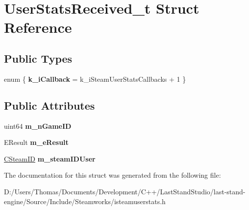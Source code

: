 \hypertarget{structUserStatsReceived__t}{}\section{User\+Stats\+Received\+\_\+t Struct Reference}
\label{structUserStatsReceived__t}
\subsection*{Public Types}
\begin{DoxyCompactItemize}
\item 
\hypertarget{structUserStatsReceived__t_ac24670a3f380c280ee4356b5b9950954}{}enum \{ {\bfseries k\+\_\+i\+Callback} = k\+\_\+i\+Steam\+User\+Stats\+Callbacks + 1
 \}\label{structUserStatsReceived__t_ac24670a3f380c280ee4356b5b9950954}

\end{DoxyCompactItemize}
\subsection*{Public Attributes}
\begin{DoxyCompactItemize}
\item 
\hypertarget{structUserStatsReceived__t_abee16d071fcdbdf406571d3cedea93ad}{}uint64 {\bfseries m\+\_\+n\+Game\+I\+D}\label{structUserStatsReceived__t_abee16d071fcdbdf406571d3cedea93ad}

\item 
\hypertarget{structUserStatsReceived__t_a6e261e1d71ecd777a7f76a2a4c193c68}{}E\+Result {\bfseries m\+\_\+e\+Result}\label{structUserStatsReceived__t_a6e261e1d71ecd777a7f76a2a4c193c68}

\item 
\hypertarget{structUserStatsReceived__t_a2c03e0a8a8c581c06d1193711770f430}{}\hyperlink{classCSteamID}{C\+Steam\+I\+D} {\bfseries m\+\_\+steam\+I\+D\+User}\label{structUserStatsReceived__t_a2c03e0a8a8c581c06d1193711770f430}

\end{DoxyCompactItemize}


The documentation for this struct was generated from the following file\+:\begin{DoxyCompactItemize}
\item 
D\+:/\+Users/\+Thomas/\+Documents/\+Development/\+C++/\+Last\+Stand\+Studio/last-\/stand-\/engine/\+Source/\+Include/\+Steamworks/isteamuserstats.\+h\end{DoxyCompactItemize}
